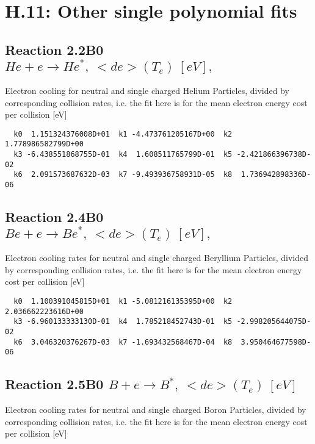 \documentclass[12pt,dvipdfmx]{article}
\begin{document}
\section{H.11: Other single polynomial fits}

\subsection{
Reaction 2.2B0   $ He + e  \rightarrow He^*,    \ <de>(T_e) \ [eV], $
}

  Electron cooling for neutral and single
  charged Helium Particles, divided by corresponding collision rates, i.e. the fit here is for the mean electron energy cost per collision [eV]

\begin{small}\begin{verbatim}
  k0  1.151324376008D+01  k1 -4.473761205167D+00  k2  1.778986582799D+00
  k3 -6.438551868755D-01  k4  1.608511765799D-01  k5 -2.421866396738D-02
  k6  2.091573687632D-03  k7 -9.493936758931D-05  k8  1.736942898336D-06

\end{verbatim}\end{small}


\subsection{
Reaction 2.4B0  $   Be + e \rightarrow Be^*,   \ <de>(T_e)  \ [eV],$
}

  Electron cooling rates for neutral and single
  charged Beryllium Particles, divided by corresponding collision rates, i.e. the fit here is for the mean electron energy cost per collision [eV]

\begin{small}\begin{verbatim}
  k0  1.100391045815D+01  k1 -5.081216135395D+00  k2  2.036662223616D+00
  k3 -6.960133333130D-01  k4  1.785218452743D-01  k5 -2.998205644075D-02
  k6  3.046320376267D-03  k7 -1.693432568467D-04  k8  3.950464677598D-06

\end{verbatim}\end{small}
\subsection{
Reaction 2.5B0   $  B + e \rightarrow B^*,  \ <de>(T_e) \ [eV] $
}

 Electron cooling rates for neutral and single
 charged Boron Particles, divided by corresponding collision rates, i.e. the fit here is for the mean electron energy cost per collision [eV]
\end{document}
